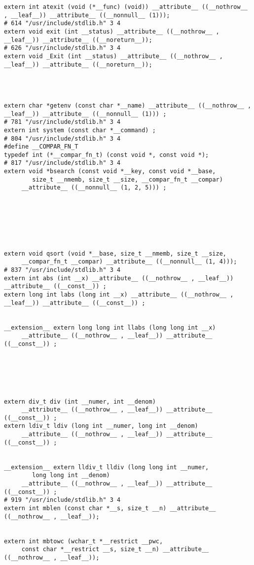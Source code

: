 \documentclass[11pt]{article}
\begin{document}
\begin{verbatim}
extern int atexit (void (*__func) (void)) __attribute__ ((__nothrow__ , __leaf__)) __attribute__ ((__nonnull__ (1)));
# 614 "/usr/include/stdlib.h" 3 4
extern void exit (int __status) __attribute__ ((__nothrow__ , __leaf__)) __attribute__ ((__noreturn__));
# 626 "/usr/include/stdlib.h" 3 4
extern void _Exit (int __status) __attribute__ ((__nothrow__ , __leaf__)) __attribute__ ((__noreturn__));




extern char *getenv (const char *__name) __attribute__ ((__nothrow__ , __leaf__)) __attribute__ ((__nonnull__ (1))) ;
# 781 "/usr/include/stdlib.h" 3 4
extern int system (const char *__command) ;
# 804 "/usr/include/stdlib.h" 3 4
#define __COMPAR_FN_T 
typedef int (*__compar_fn_t) (const void *, const void *);
# 817 "/usr/include/stdlib.h" 3 4
extern void *bsearch (const void *__key, const void *__base,
        size_t __nmemb, size_t __size, __compar_fn_t __compar)
     __attribute__ ((__nonnull__ (1, 2, 5))) ;







extern void qsort (void *__base, size_t __nmemb, size_t __size,
     __compar_fn_t __compar) __attribute__ ((__nonnull__ (1, 4)));
# 837 "/usr/include/stdlib.h" 3 4
extern int abs (int __x) __attribute__ ((__nothrow__ , __leaf__)) __attribute__ ((__const__)) ;
extern long int labs (long int __x) __attribute__ ((__nothrow__ , __leaf__)) __attribute__ ((__const__)) ;


__extension__ extern long long int llabs (long long int __x)
     __attribute__ ((__nothrow__ , __leaf__)) __attribute__ ((__const__)) ;






extern div_t div (int __numer, int __denom)
     __attribute__ ((__nothrow__ , __leaf__)) __attribute__ ((__const__)) ;
extern ldiv_t ldiv (long int __numer, long int __denom)
     __attribute__ ((__nothrow__ , __leaf__)) __attribute__ ((__const__)) ;


__extension__ extern lldiv_t lldiv (long long int __numer,
        long long int __denom)
     __attribute__ ((__nothrow__ , __leaf__)) __attribute__ ((__const__)) ;
# 919 "/usr/include/stdlib.h" 3 4
extern int mblen (const char *__s, size_t __n) __attribute__ ((__nothrow__ , __leaf__));


extern int mbtowc (wchar_t *__restrict __pwc,
     const char *__restrict __s, size_t __n) __attribute__ ((__nothrow__ , __leaf__));



\end{verbatim}
\end{document}
